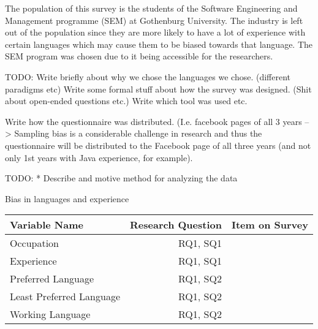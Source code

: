 \documentclass[times, 10pt,twocolumn]{IEEEtran}
\begin{document}
The population of this survey is the students of the Software Engineering and Management programme (SEM) at Gothenburg University. The industry is left out of the population since they are more likely to have a lot of experience with certain languages which may cause them to be biased towards that language. The SEM program was chosen due to it being accessible for the researchers. 
\newline



TODO: 
Write briefly about why we chose the languages we chose. (different paradigms etc)
Write some formal stuff about how the survey was designed. (Shit about open-ended questions etc.)
Write which tool was used etc. 


Write how the questionnaire was distributed. (I.e. facebook pages of all 3 years --> Sampling bias is a considerable challenge in research \cite{easterbrook2008selecting} and thus the questionnaire will be distributed to the Facebook page of all three years (and not only 1st years with Java experience, for example).  



TODO:
* Describe  and motive  method  for analyzing the data


Bias in languages and experience












\begin{tabular}{| l | r | c |}
	\hline
	\textbf{Variable Name} & \textbf{Research Question} & \textbf{Item on Survey} \\ \hline
	Occupation & RQ1, SQ1 & \\ \hline
	Experience & RQ1, SQ1 & \\ \hline
	Preferred Language & RQ1, SQ2 & \\ \hline
	Least Preferred Language & RQ1, SQ2& \\  \hline
	Working Language & RQ1, SQ2 & \\ 
	\hline
	\end{tabular}
\end{document}

